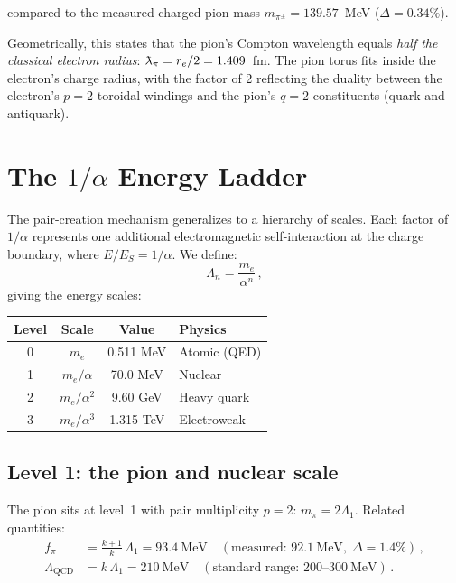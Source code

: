 \documentclass[11pt,a4paper]{article}
\newcommand{\lambdabar}{\mkern0.75mu\mathchar'26\mkern-9.75mu\lambda}
\begin{document}
compared to the measured charged pion mass $m_{\pi^\pm} = 139.57$~MeV
($\Delta = 0.34\%$).

Geometrically, this states that the pion's Compton wavelength equals
\emph{half the classical electron radius}:
$\lambdabar_\pi = r_e/2 = 1.409$~fm.
The pion torus fits inside the electron's charge radius, with the
factor of 2 reflecting the duality between the electron's $p=2$
toroidal windings and the pion's $q=2$ constituents (quark and
antiquark).


\section{The $1/\alpha$ Energy Ladder}
\label{sec:ladder}

The pair-creation mechanism generalizes to a hierarchy of scales.
Each factor of $1/\alpha$ represents one additional electromagnetic
self-interaction at the charge boundary, where $E/E_S = 1/\alpha$.
We define:
\begin{equation}
  \Lambda_n = \frac{m_e}{\alpha^n}\,,
  \label{eq:ladder}
\end{equation}
giving the energy scales:
\begin{center}
\begin{tabular}{cccl}
\toprule
Level & Scale & Value & Physics \\
\midrule
0 & $m_e$ & 0.511 MeV & Atomic (QED) \\
1 & $m_e/\alpha$ & 70.0 MeV & Nuclear \\
2 & $m_e/\alpha^2$ & 9.60 GeV & Heavy quark \\
3 & $m_e/\alpha^3$ & 1.315 TeV & Electroweak \\
\bottomrule
\end{tabular}
\end{center}


\subsection{Level 1: the pion and nuclear scale}
\label{sec:level1}

The pion sits at level~1 with pair multiplicity $p=2$:
$m_\pi = 2\Lambda_1$.  Related quantities:
\begin{align}
  f_\pi &= \frac{k+1}{k}\,\Lambda_1 = 93.4~\text{MeV}
  \quad (\text{measured: } 92.1~\text{MeV}, \;\Delta = 1.4\%)\,,
  \\
  \Lambda_{\text{QCD}} &= k\,\Lambda_1 = 210~\text{MeV}
  \quad (\text{standard range: } 200\text{--}300~\text{MeV})\,.
\end{align}
\end{document}
